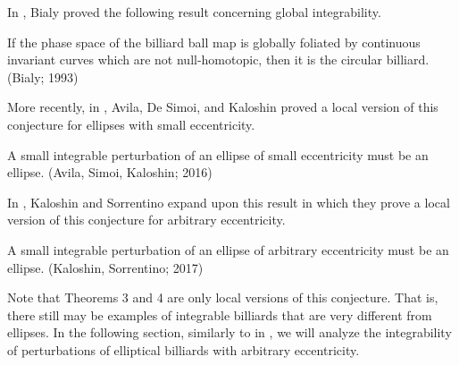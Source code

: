 In \cite{Bialy1993}, Bialy proved the following result concerning global integrability.

\begin{theorem}
 If the phase space of the billiard ball map is globally foliated by continuous invariant curves which are not null-homotopic, then it is the circular billiard. (Bialy; 1993)
\end{theorem}

More recently, in \cite{Avila2016}, Avila, De Simoi, and Kaloshin proved a local version of this conjecture for ellipses with small eccentricity.

\begin{theorem}
A small integrable perturbation of an ellipse of small eccentricity must be an ellipse. (Avila, Simoi, Kaloshin; 2016)
\end{theorem}

In \cite{Kaloshin2016}, Kaloshin and Sorrentino expand upon this result in which they prove a local version of this conjecture for arbitrary eccentricity.

\begin{theorem}
 A small integrable perturbation of an ellipse of arbitrary eccentricity must be an ellipse. (Kaloshin, Sorrentino; 2017)
\end{theorem}

Note that Theorems 3 and 4 are only local versions of this conjecture. That is, there still may be examples of integrable billiards that are very different from ellipses. In the following section, similarly to in \cite{Kaloshin2016}, we will analyze the integrability of perturbations of elliptical billiards with arbitrary eccentricity.